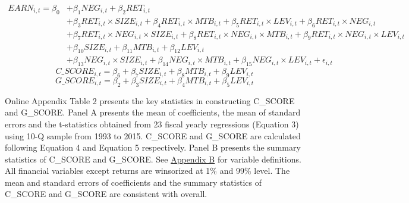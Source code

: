 \newpage

\setcounter{equation}{2}
\begin{equation}
\begin{split}
EARN_{i,t} = \beta_0&+\beta_1NEG_{i,t}+\beta_2RET_{i,t}\\
&+\beta_3RET_{i,t}\times SIZE_{i,t}+\beta_4RET_{i,t}\times MTB_{i,t}+\beta_5RET_{i,t}\times LEV_{i,t}+\beta_6RET_{i,t}\times NEG_{i,t}\\
&+\beta_7RET_{i,t}\times NEG_{i,t}\times SIZE_{i,t}+\beta_8RET_{i,t}\times NEG_{i,t}\times MTB_{i,t}+\beta_9RET_{i,t}\times NEG_{i,t}\times LEV_{i,t}\\
&+\beta_{10}SIZE_{i,t}+\beta_{11}MTB_{i,t}+\beta_{12}LEV_{i,t}\\
&+\beta_{13}NEG_{i,t}\times SIZE_{i,t}+\beta_{14}NEG_{i,t}\times MTB_{i,t}+\beta_{15}NEG_{i,t}\times LEV_{i,t}+ \epsilon_{i,t}
\end{split}
\end{equation}
\begin{equation}
C\_SCORE_{i,t} = \beta_6+\beta_7SIZE_{i,t}+\beta_8MTB_{i,t}+\beta_9LEV_{i,t}
\end{equation}
\begin{equation}
G\_SCORE_{i,t} = \beta_2+\beta_3SIZE_{i,t}+\beta_4MTB_{i,t}+\beta_5LEV_{i,t}
\end{equation}

Online Appendix Table 2 presents the key statistics in constructing C\_SCORE and G\_SCORE. Panel A presents the mean of coefficients, the mean of standard errors and the t-statistics obtained from 23 fiscal yearly regressions (Equation 3) using 10-Q sample from 1993 to 2015. C\_SCORE and G\_SCORE are calculated following Equation 4 and Equation 5 respectively. Panel B presents the summary statistics of C\_SCORE and G\_SCORE. See \hyperref[appb]{Appendix B} for variable definitions. All financial variables except returns are winsorized at 1\% and 99\% level. The mean and standard errors of coefficients and the summary statistics of C\_SCORE and G\_SCORE are consistent with  overall. 
